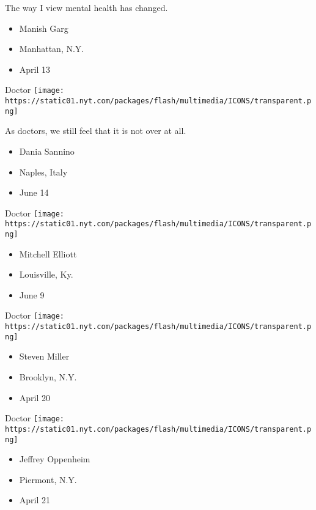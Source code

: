 The way I view mental health has changed.

\begin{itemize}
\tightlist
\item
  Manish Garg
\item
  Manhattan, N.Y.
\item
  April 13
\end{itemize}

\protect\hyperlink{item-dania-sannino}{}

Doctor
\texttt{[image: https://static01.nyt.com/packages/flash/multimedia/ICONS/transparent.png]}

As doctors, we still feel that it is not over at all.

\begin{itemize}
\tightlist
\item
  Dania Sannino
\item
  Naples, Italy
\item
  June 14
\end{itemize}

\protect\hyperlink{item-mitchell-elliott}{}

Doctor
\texttt{[image: https://static01.nyt.com/packages/flash/multimedia/ICONS/transparent.png]}

\begin{itemize}
\tightlist
\item
  Mitchell Elliott
\item
  Louisville, Ky.
\item
  June 9
\end{itemize}

\protect\hyperlink{item-steven-miller}{}

Doctor
\texttt{[image: https://static01.nyt.com/packages/flash/multimedia/ICONS/transparent.png]}

\begin{itemize}
\tightlist
\item
  Steven Miller
\item
  Brooklyn, N.Y.
\item
  April 20
\end{itemize}

\protect\hyperlink{item-jeffrey-oppenheim}{}

Doctor
\texttt{[image: https://static01.nyt.com/packages/flash/multimedia/ICONS/transparent.png]}

\begin{itemize}
\tightlist
\item
  Jeffrey Oppenheim
\item
  Piermont, N.Y.
\item
  April 21
\end{itemize}

